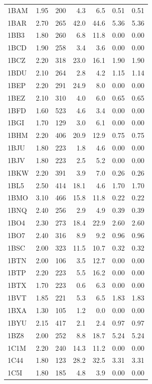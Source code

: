\begin{longtable}{lrrrrrr}
1BAM & 1.95 & 200 & 4.3 & 6.5 & 0.51 & 0.51 \\
1BAR & 2.70 & 265 & 42.0 & 44.6 & 5.36 & 5.36 \\
1BB3 & 1.80 & 260 & 6.8 & 11.8 & 0.00 & 0.00 \\
1BCD & 1.90 & 258 & 3.4 & 3.6 & 0.00 & 0.00 \\
1BCZ & 2.20 & 318 & 23.0 & 16.1 & 1.90 & 1.90 \\
1BDU & 2.10 & 264 & 2.8 & 4.2 & 1.15 & 1.14 \\
1BEP & 2.20 & 291 & 24.9 & 8.0 & 0.00 & 0.00 \\
1BEZ & 2.10 & 310 & 4.0 & 6.0 & 0.65 & 0.65 \\
1BFD & 1.60 & 523 & 4.6 & 3.4 & 0.00 & 0.00 \\
1BGI & 1.70 & 129 & 3.0 & 6.1 & 0.00 & 0.00 \\
1BHM & 2.20 & 406 & 20.9 & 12.9 & 0.75 & 0.75 \\
1BJU & 1.80 & 223 & 1.8 & 4.6 & 0.00 & 0.00 \\
1BJV & 1.80 & 223 & 2.5 & 5.2 & 0.00 & 0.00 \\
1BKW & 2.20 & 391 & 3.9 & 7.0 & 0.26 & 0.26 \\
1BL5 & 2.50 & 414 & 18.1 & 4.6 & 1.70 & 1.70 \\
1BMO & 3.10 & 466 & 15.8 & 11.8 & 0.22 & 0.22 \\
1BNQ & 2.40 & 256 & 2.9 & 4.9 & 0.39 & 0.39 \\
1BO4 & 2.30 & 273 & 18.4 & 22.9 & 2.60 & 2.60 \\
1BO7 & 2.40 & 316 & 8.9 & 9.2 & 0.96 & 0.96 \\
1BSC & 2.00 & 323 & 11.5 & 10.7 & 0.32 & 0.32 \\
1BTN & 2.00 & 106 & 3.5 & 12.7 & 0.00 & 0.00 \\
1BTP & 2.20 & 223 & 5.5 & 16.2 & 0.00 & 0.00 \\
1BTX & 1.70 & 223 & 0.6 & 6.3 & 0.00 & 0.00 \\
1BVT & 1.85 & 221 & 5.3 & 6.5 & 1.83 & 1.83 \\
1BXA & 1.30 & 105 & 1.2 & 0.0 & 0.00 & 0.00 \\
1BYU & 2.15 & 417 & 2.1 & 2.4 & 0.97 & 0.97 \\
1BZ8 & 2.00 & 252 & 8.8 & 18.7 & 5.24 & 5.24 \\
1C1M & 2.20 & 240 & 14.3 & 11.2 & 0.00 & 0.00 \\
1C44 & 1.80 & 123 & 28.2 & 32.5 & 3.31 & 3.31 \\
1C5I & 1.80 & 185 & 4.8 & 3.9 & 0.00 & 0.00 \\

\end{longtable}
